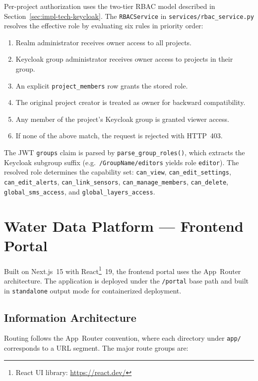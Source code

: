 Per-project authorization uses the two-tier RBAC model described in
Section~\ref{sec:impl-tech-keycloak}. The \texttt{RBACService} in
\texttt{services/rbac\_service.py} resolves the effective role by evaluating six rules in
priority order:
\begin{enumerate}
  \item Realm administrator receives owner access to all projects.
  \item Keycloak group administrator receives owner access to projects in their group.
  \item An explicit \texttt{project\_members} row grants the stored role.
  \item The original project creator is treated as owner for backward compatibility.
  \item Any member of the project's Keycloak group is granted viewer access.
  \item If none of the above match, the request is rejected with HTTP~403.
\end{enumerate}
The JWT \texttt{groups} claim is parsed by
\texttt{parse\_group\_roles()}, which extracts the Keycloak subgroup suffix
(e.g.\ \texttt{/GroupName/editors} yields role \texttt{editor}). The resolved role determines
the capability set: \texttt{can\_view}, \texttt{can\_edit\_settings},
\texttt{can\_edit\_alerts}, \texttt{can\_link\_sensors}, \texttt{can\_manage\_members},
\texttt{can\_delete}, \texttt{global\_sms\_access}, and \texttt{global\_layers\_access}.

\section{Water Data Platform --- Frontend Portal}
\label{sec:impl-frontend}

Built on Next.js~15 with React\footnote{React UI library: \url{https://react.dev/}}~19, the frontend portal uses the App~Router architecture. The
application is deployed under the \texttt{/portal} base path and built in \texttt{standalone}
output mode for containerized deployment.

\subsection{Information Architecture}
\label{sec:impl-frontend-ia}

Routing follows the App~Router convention, where each directory under
\texttt{app/} corresponds to a URL segment. The major route groups are:

